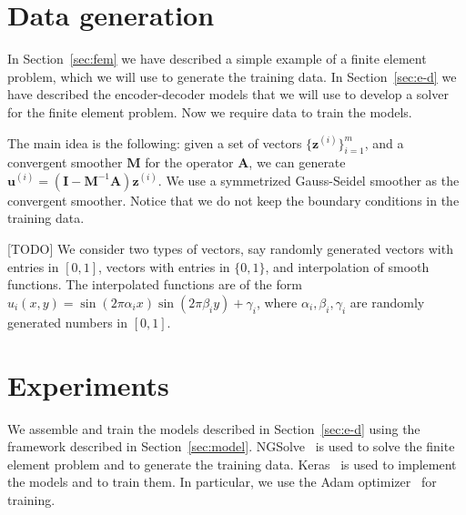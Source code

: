 \section{Data generation}

In Section~\ref{sec:fem} we have described a simple example of a finite element problem, which we will use to generate the training data.
In Section~\ref{sec:e-d} we have described the encoder-decoder models that we will use to develop a solver for the finite element problem.
Now we require data to train the models.

The main idea is the following: given a set of vectors \( \{ \mathbf{z}^{(i)} \}_{i=1}^{m} \), and a convergent smoother \( \mathbf{M}\) for the operator \(\mathbf{A}\), we can generate \( \mathbf{u}^{(i)} = (\mathbf{I} - \mathbf{M}^{-1} \mathbf{A}) \mathbf{z}^{(i)} \).
We use a symmetrized Gauss-Seidel smoother as the convergent smoother.
Notice that we do not keep the boundary conditions in the training data.

[TODO]
We consider two types of vectors, say randomly generated vectors with entries in \([0,1]\), vectors with entries in \(\{0,1\}\), and interpolation of smooth functions.
The interpolated functions are of the form \(u_i(x,y) = \sin(2 \pi \alpha_i x) \sin(2 \pi \beta_i y) + \gamma_i\), where \(\alpha_i, \beta_i, \gamma_i\) are randomly generated numbers in \([0,1]\).

\section{Experiments}

We assemble and train the models described in Section~\ref{sec:e-d} using the framework described in Section~\ref{sec:model}.
NGSolve~\cite{schoberl2014c++} is used to solve the finite element problem and to generate the training data.
Keras~\cite{chollet2015keras} is used to implement the models and to train them.
In particular, we use the Adam optimizer~\cite{kingma2014adam} for training.
